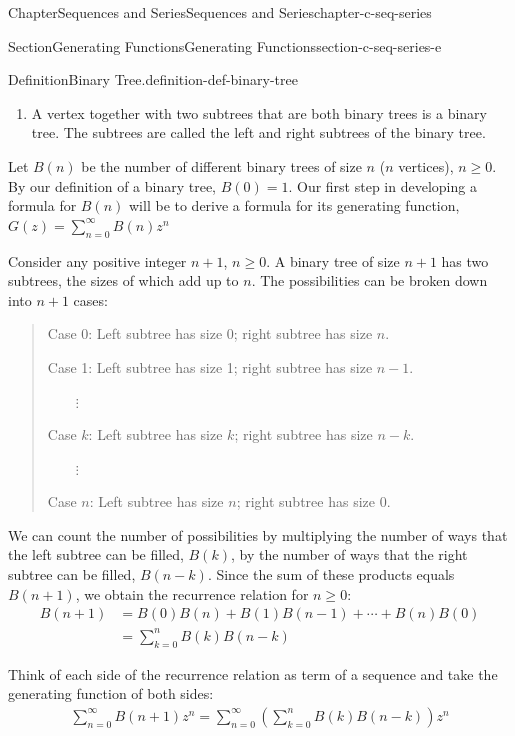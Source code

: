 \documentclass[oneside,10pt,]{book}
\numberwithin{equation}{section}
\begin{document}
\begin{chapterptx}{Chapter}{Sequences and Series}{}{Sequences and Series}{}{}{chapter-c-seq-series}
\begin{sectionptx}{Section}{Generating Functions}{}{Generating Functions}{}{}{section-c-seq-series-e}
\begin{definition}{Definition}{Binary Tree.}{definition-def-binary-tree}
\begin{enumerate}[label=(\arabic*)]
\item{}A vertex together with two subtrees that are both binary trees is a binary tree. The subtrees are called the left and right subtrees of the binary tree.%
\end{enumerate}
%
\end{definition}
Let \(B(n)\) be the number of different binary trees of size \(n\) (\(n\) vertices), \(n \geq  0\). By our definition of a binary tree, \(B(0) = 1\). Our first step in developing a formula for \(B(n)\) will be to derive a formula for its generating function, \(G(z)=\sum_{n=0}^{\infty} B(n)z^n\)%
\par
Consider any positive integer \(n + 1\), \(n \geq  0\). A binary tree of size \(n + 1\) has two subtrees, the sizes of which add up to \(n\). The possibilities can be broken down into \(n + 1\) cases:%
\begin{quote}%
Case 0: Left subtree has size 0; right subtree has size \(n\).%
\par
Case 1: Left subtree has size 1; right subtree has size \(n - 1\).%
\par
\(\quad \quad \)\(\vdots\)%
\par
Case \(k\): Left subtree has size \(k\); right subtree has size \(n - k\).%
\par
\(\quad \quad \)\(\vdots\)%
\par
Case \(n\): Left subtree has size \(n\); right subtree has size 0.%
\end{quote}
We can count the number of possibilities by multiplying the number of ways that the left subtree can be filled, \(B(k)\), by the number of ways that the right subtree can be filled, \(B(n-k)\). Since the sum of these products equals \(B(n + 1)\), we obtain the recurrence relation for \(n\geq 0\):%
\begin{equation*}
\begin{split}
B(n+1) &= B(0)B(n)+ B(1)B(n-1)+ \cdots  + B(n)B(0)\\
&=\sum_{k=0}^n B(k) B(n-k)
\end{split} 
\end{equation*}
%
\par
Think of each side of the recurrence relation as term of a sequence and take the generating function of both sides:%
\begin{gather}
\sum_{n=0}^{\infty } B(n+1) z^n= \sum_{n=0}^{\infty }  \left(\sum_{k=0}^n B(k) B(n-k)\right)z^n\label{mrow-eq-bin-gf}
\end{gather}
%
\par

\end{sectionptx}
\end{chapterptx}
\end{document}
